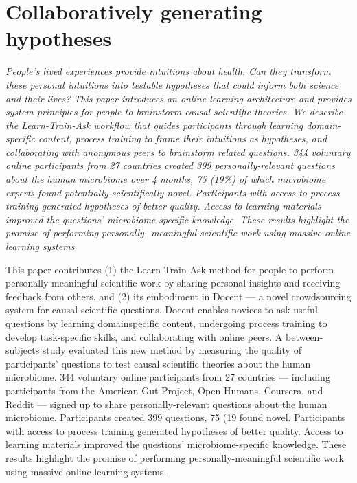 

\chapter{Collaboratively generating hypotheses}

\textit{People’s lived experiences provide intuitions about health.
Can they transform these personal intuitions into testable hypotheses
that could inform both science and their lives? This
paper introduces an online learning architecture and provides
system principles for people to brainstorm causal scientific
theories. We describe the Learn-Train-Ask workflow that
guides participants through learning domain-specific content,
process training to frame their intuitions as hypotheses,
and collaborating with anonymous peers to brainstorm related
questions. 344 voluntary online participants from 27
countries created 399 personally-relevant questions about the
human microbiome over 4 months, 75 (19\%) of which microbiome
experts found potentially scientifically novel. Participants
with access to process training generated
hypotheses of better quality. Access to learning materials improved
the questions’ microbiome-specific knowledge.
These results highlight the promise of performing personally-
meaningful scientific work using massive online learning
systems}

This paper contributes (1) the Learn-Train-Ask method for
people to perform personally meaningful scientific work by
sharing personal insights and receiving feedback from
others, and (2) its embodiment in Docent — a novel
crowdsourcing system for causal scientific questions. Docent
enables novices to ask useful questions by learning domainspecific
content, undergoing process training to develop
task-specific skills, and collaborating with online peers. A
between-subjects study evaluated this new method by measuring
the quality of participants’ questions to test causal scientific
theories about the human microbiome. 344 voluntary
online participants from 27 countries — including participants
from the American Gut Project, Open Humans,
Coursera, and Reddit — signed up to share personally-relevant
questions about the human microbiome. Participants
created 399 questions, 75 (19%
found novel. Participants with access to process training
generated hypotheses of better quality. Access to
learning materials improved the questions’ microbiome-specific
knowledge. These results highlight the promise of performing
personally-meaningful scientific work using
massive online learning systems.

